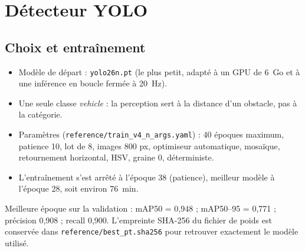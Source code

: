 \documentclass[11pt,a4paper]{article}
\newcommand{\code}[1]{\texttt{#1}}
\begin{document}
\section{D\'etecteur YOLO}
\subsection{Choix et entra\^inement}
\begin{itemize}
\item Mod\`ele de d\'epart : \code{yolo26n.pt} (le plus petit, adapt\'e \`a un GPU de 6~Go et \`a une inf\'erence en boucle ferm\'ee \`a 20~Hz).
\item Une seule classe \emph{vehicle} : la perception sert \`a la distance d'un obstacle, pas \`a la cat\'egorie.
\item Param\`etres (\code{reference/train\_v4\_n\_args.yaml}) : 40 \'epoques maximum, patience 10, lot de 8, images 800 px, optimiseur automatique,
      mosa\"ique, retournement horizontal, HSV, graine 0, d\'eterministe.
\item L'entra\^inement s'est arr\^et\'e \`a l'\'epoque 38 (patience), meilleur mod\`ele \`a l'\'epoque 28, soit environ 76~min.
\end{itemize}
Meilleure \'epoque sur la validation : mAP50 = 0,948 ; mAP50--95 = 0,771 ; pr\'ecision 0,908 ; recall 0,900.
L'empreinte SHA-256 du fichier de poids est conserv\'ee dans \code{reference/best\_pt.sha256} pour retrouver exactement le mod\`ele utilis\'e.
\end{document}
